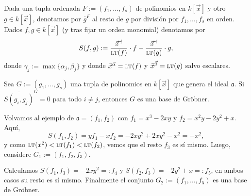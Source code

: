 \documentclass[11pt, reqno]{amsart}
\DeclareMathOperator{\LT}{\text{\textsc{lt}}}
\begin{document}
\begin{mydef}
	Dada una tupla ordenada $F := (f_1, \dots, f_s)$ de polinomios en $k[\vec x]$ y otro $g \in k[\vec x]$, denotamos por
	$\overline{g}^F$ al resto de $g$ por división por $f_1, \dots, f_s$ en orden.
	Dados $f, g \in k[\vec x]$ (y tras fijar un orden monomial) denotamos por
	\[
		S(f, g) := \frac{\vec x^{\vec\gamma}}{\LT(f)} \cdot f - \frac{\vec x^{\vec\gamma}}{\LT(g)} \cdot g,
	\]
	donde $\gamma_j := \max\{ \alpha_j, \beta_j \}$ y donde $\vec x^{\vec\alpha} = \LT(f)$ y $\vec x^{\vec\beta} = \LT(g)$ salvo
	escalares.
\end{mydef}
\begin{thm}
	Sea $G := (g_1, \dots, g_s)$ una tupla de polinomios en $k[\vec x]$ que genera el ideal $\mathfrak{a}$.
	Si $\overline{S(g_i, g_j)}^G = 0$ para todo $i \ne j$, entonces $G$ es una base de Gröbner.
\end{thm}
\begin{ex}
	Volvamos al ejemplo de $\mathfrak{a} = (f_1, f_2)$ con $f_1 = x^3 - 2xy$ y $f_2 = x^2y - 2y^2 + x$.
	Aquí,
	\[
		S(f_1, f_2) = yf_1 - xf_2 = -2xy^2 + 2xy^2 - x^2 = -x^2,
	\]
	y como $\LT(x^2) < \LT(f_1) < \LT(f_2)$, vemos que el resto $f_3$ es sí mismo.
	Luego, considere $G_1 := (f_1, f_2, f_3)$.

	Calculamos $S(f_1, f_3) = -2xy^2 =: f_4$ y $S(f_2, f_3) = -2y^2 + x =: f_5$, en ambos casos su resto es sí mismo.
	Finalmente el conjunto $G_2 := (f_1, \dots, f_5)$ es una base de Gröbner.
\end{ex}

\begin{additional}
\appendix
\printbibliography
\end{additional}
\end{document}
